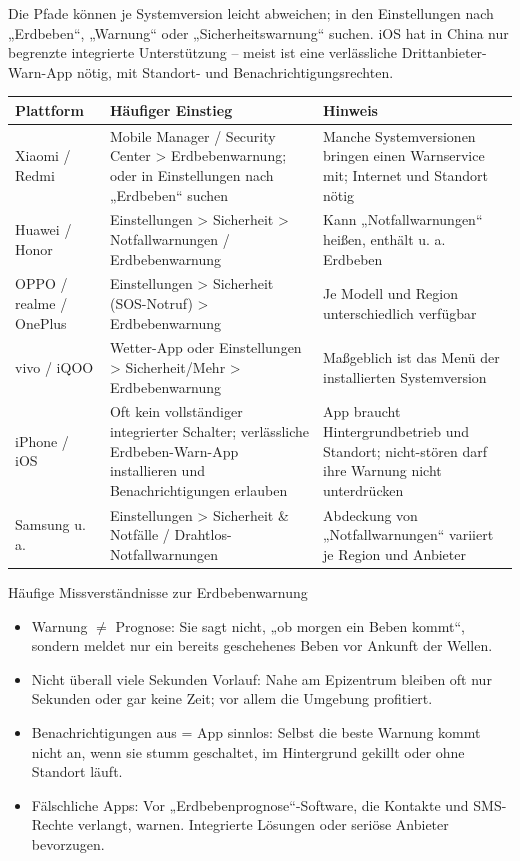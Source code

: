 Die Pfade können je Systemversion leicht abweichen; in den Einstellungen nach „Erdbeben“, „Warnung“ oder „Sicherheitswarnung“ suchen. iOS hat in China nur begrenzte integrierte Unterstützung – meist ist eine verlässliche Drittanbieter-Warn-App nötig, mit Standort- und Benachrichtigungsrechten.

\begin{center}
\begin{tabularx}{\linewidth}{|X|X|X|}
\hline
\textbf{Plattform} & \textbf{Häufiger Einstieg} & \textbf{Hinweis} \tabularnewline
\hline
Xiaomi / Redmi & Mobile Manager / Security Center > Erdbebenwarnung; oder in Einstellungen nach „Erdbeben“ suchen & Manche Systemversionen bringen einen Warnservice mit; Internet und Standort nötig \tabularnewline
Huawei / Honor & Einstellungen > Sicherheit > Notfallwarnungen / Erdbebenwarnung & Kann „Notfallwarnungen“ heißen, enthält u. a. Erdbeben \tabularnewline
OPPO / realme / OnePlus & Einstellungen > Sicherheit (SOS-Notruf) > Erdbebenwarnung & Je Modell und Region unterschiedlich verfügbar \tabularnewline
vivo / iQOO & Wetter-App oder Einstellungen > Sicherheit/Mehr > Erdbebenwarnung & Maßgeblich ist das Menü der installierten Systemversion \tabularnewline
iPhone / iOS & Oft kein vollständiger integrierter Schalter; verlässliche Erdbeben-Warn-App installieren und Benachrichtigungen erlauben & App braucht Hintergrundbetrieb und Standort; nicht-stören darf ihre Warnung nicht unterdrücken \tabularnewline
Samsung u. a. & Einstellungen > Sicherheit \& Notfälle / Drahtlos-Notfallwarnungen & Abdeckung von „Notfallwarnungen“ variiert je Region und Anbieter \tabularnewline
\hline
\end{tabularx}
\end{center}

\begin{tcbwarn}{Häufige Missverständnisse zur Erdbebenwarnung}
\begin{itemize}
  \item Warnung $\neq$ Prognose: Sie sagt nicht, „ob morgen ein Beben kommt“, sondern meldet nur ein bereits geschehenes Beben vor Ankunft der Wellen.
  \item Nicht überall viele Sekunden Vorlauf: Nahe am Epizentrum bleiben oft nur Sekunden oder gar keine Zeit; vor allem die Umgebung profitiert.
  \item Benachrichtigungen aus = App sinnlos: Selbst die beste Warnung kommt nicht an, wenn sie stumm geschaltet, im Hintergrund gekillt oder ohne Standort läuft.
  \item Fälschliche Apps: Vor „Erdbebenprognose“-Software, die Kontakte und SMS-Rechte verlangt, warnen. Integrierte Lösungen oder seriöse Anbieter bevorzugen.
\end{itemize}

\end{tcbwarn}

